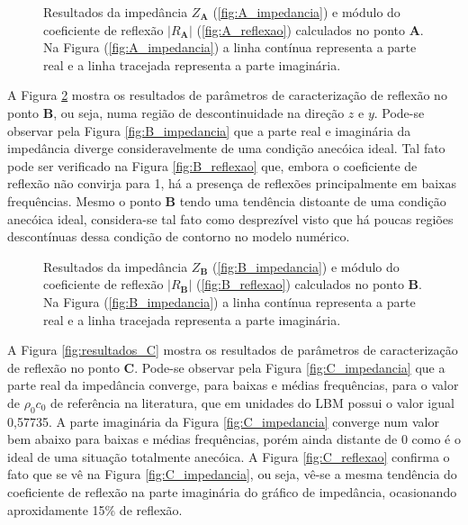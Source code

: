 \begin{figure}[ht!]
\begin{subfigure}{\scaleA \textwidth}
  
\end{subfigure}%
\begin{subfigure}{\scaleA \textwidth}
  
\end{subfigure}
\caption[Resultados de reflexão no ponto \textbf{A}]{Resultados da impedância $Z_{\textbf{A}}$ (\ref{fig:A_impedancia}) e módulo do coeficiente de reflexão $|R_{\textbf{A}}|$ (\ref{fig:A_reflexao}) calculados no ponto $\textbf{A}$. Na Figura (\ref{fig:A_impedancia}) a linha contínua representa a parte real e a linha tracejada representa a parte imaginária.}
\label{fig:resultados_A}
\end{figure}

A Figura \ref{fig:resultados_B} mostra os resultados de parâmetros de caracterização de reflexão no ponto \textbf{B}, ou seja, numa região de descontinuidade na direção $z$ e $y$. Pode-se observar pela Figura \ref{fig:B_impedancia} que a parte real e imaginária da impedância diverge consideravelmente de uma condição anecóica ideal. Tal fato pode ser verificado na Figura \ref{fig:B_reflexao} que, embora o coeficiente de reflexão não convirja para 1, há a presença de reflexões principalmente em baixas frequências. Mesmo o ponto \textbf{B} tendo uma tendência distoante de uma condição anecóica ideal, considera-se tal fato como desprezível visto que há poucas regiões descontínuas dessa condição de contorno no modelo numérico. 

\begin{figure}
\begin{subfigure}{\scaleA \textwidth}
  
\end{subfigure}%
\begin{subfigure}{\scaleA \textwidth}
  
\end{subfigure}
\caption[Resultados de reflexão no ponto \textbf{B}]{Resultados da impedância $Z_{\textbf{B}}$ (\ref{fig:B_impedancia}) e módulo do coeficiente de reflexão $|R_{\textbf{B}}|$ (\ref{fig:B_reflexao}) calculados no ponto $\textbf{B}$. Na Figura (\ref{fig:B_impedancia}) a linha contínua representa a parte real e a linha tracejada representa a parte imaginária.}
\label{fig:resultados_B}
\end{figure}

\newpage
A Figura \ref{fig:resultados_C} mostra os resultados de parâmetros de caracterização de reflexão no ponto \textbf{C}. Pode-se observar pela Figura \ref{fig:C_impedancia} que a parte real da impedância converge, para baixas e médias frequências, para o valor de $\rho_{0} c_{0}$ de referência na literatura, que em unidades do LBM possui o valor igual 0,57735. A parte imaginária da Figura \ref{fig:C_impedancia} converge num valor bem abaixo para baixas e médias frequências, porém ainda distante de 0 como é o ideal de uma situação totalmente anecóica. A Figura \ref{fig:C_reflexao} confirma o fato que se vê na Figura \ref{fig:C_impedancia}, ou seja, vê-se a mesma tendência do coeficiente de reflexão na parte imaginária do gráfico de impedância, ocasionando aproxidamente 15\% de reflexão.

